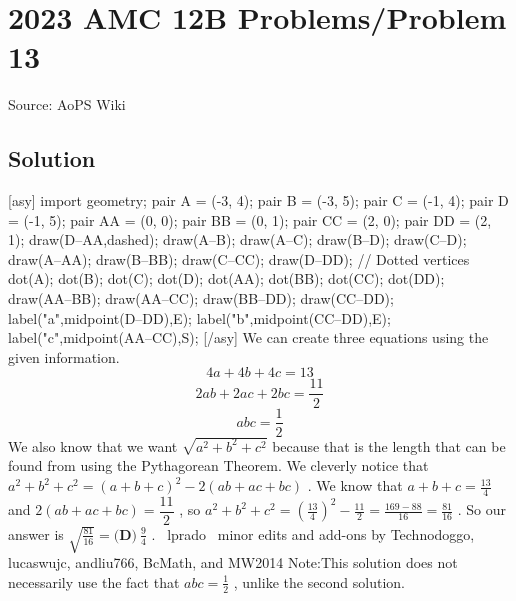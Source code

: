 \documentclass[12pt]{article}
\begin{document}
\section*{{2023 AMC 12B Problems/Problem 13}}
Source: AoPS Wiki

\subsection*{Solution}
[asy] import geometry; pair A = (-3, 4); pair B = (-3, 5); pair C = (-1, 4); pair D = (-1, 5); pair AA = (0, 0); pair BB = (0, 1); pair CC = (2, 0); pair DD = (2, 1); draw(D--AA,dashed); draw(A--B); draw(A--C); draw(B--D); draw(C--D); draw(A--AA); draw(B--BB); draw(C--CC); draw(D--DD); // Dotted vertices dot(A); dot(B); dot(C); dot(D); dot(AA); dot(BB); dot(CC); dot(DD); draw(AA--BB); draw(AA--CC); draw(BB--DD); draw(CC--DD); label("a",midpoint(D--DD),E); label("b",midpoint(CC--DD),E); label("c",midpoint(AA--CC),S); [/asy] We can create three equations using the given information. \[4a+4b+4c = 13\] \[2ab+2ac+2bc=\frac{11}{2}\] \[abc=\frac{1}{2}\] We also know that we want $\sqrt{a^2 + b^2 + c^2}$ because that is the length that can be found from using the Pythagorean Theorem. We cleverly notice that $a^2 + b^2 + c^2 = (a+b+c)^2 - 2(ab+ac+bc)$ . We know that $a+b+c = \frac{13}{4}$ and $2(ab+ac+bc)=\dfrac{11}2$ , so $a^2 + b^2 + c^2 = \left(\frac{13}{4}\right)^2 - \frac{11}{2} = \frac{169-88}{16} = \frac{81}{16}$ . So our answer is $\sqrt{\frac{81}{16}} = \boxed{\textbf{(D)}~\tfrac94}$ . ~lprado ~minor edits and add-ons by Technodoggo, lucaswujc, andliu766, BcMath, and MW2014
Note:This solution does not necessarily use the fact that $abc=\frac{1}{2}$ , unlike the second solution.
\end{document}
